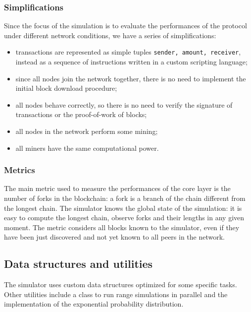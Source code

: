 \subsubsection{Simplifications}
Since the focus of the simulation is to evaluate the performances of the protocol under different network conditions, we have a series of simplifications:
\begin{itemize}
	\item transactions are represented as simple tuples \texttt{\textlangle sender, amount, receiver\textrangle}, instead as a sequence of instructions written in a custom scripting language;
	\item since all nodes join the network together, there is no need to implement the initial block download procedure;
	\item all nodes behave correctly, so there is no need to verify the signature of transactions or the proof-of-work of blocks;
	\item all nodes in the network perform some mining;
	\item all miners have the same computational power.
\end{itemize}

\subsubsection{Metrics}
The main metric used to measure the performances of the core layer is the number of forks in the blockchain:
a fork is a branch of the chain different from the longest chain.
The simulator knows the global state of the simulation:
it is easy to compute the longest chain, observe forks and their lengths in any given moment.
The metric considers all blocks known to the simulator, even if they have been just discovered and not yet known to all peers in the network.

\subsection{Data structures and utilities}
The simulator uses custom data structures optimized for some specific tasks.
Other utilities include a class to run range simulations in parallel and the implementation of the exponential probability distribution.

